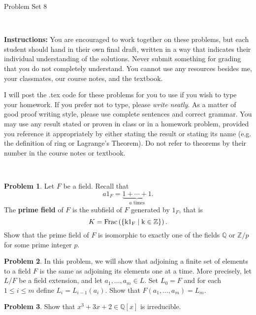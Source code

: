 \documentclass[11pt]{article}
\title{}
\date{\vspace{-0.5in}}
\newcommand{\Q}{\mathbb{Q}}
\newcommand{\Z}{\mathbb{Z}}
\theoremstyle{definition}
\newtheorem{problem}{Problem}
\begin{document}
\thispagestyle{fancy}
\pagestyle{fancy}

\vspace{3em}

\begin{center}
	{\LARGE Problem Set 8}
\end{center}

\

\noindent
{\bf Instructions:}
You are encouraged to work together on these problems, but each student should hand in their own final draft, written in a way that indicates their individual understanding of the solutions. Never submit something for grading that you do not completely understand. You cannot use any resources besides me, your classmates, our course notes, and the textbook.


I will post the .tex code for these problems for you to use if you wish to type your homework. If you prefer not to type, please  {\em write neatly}. As a matter of good proof writing style, please use complete sentences and correct grammar. You may use any result  stated or proven in class or in a homework problem, provided you reference it appropriately by either stating the result or stating its name (e.g. the definition of ring or Lagrange's Theorem). Do not refer to theorems by their number in the course notes or textbook.


\


\begin{problem}
Let $F$ be a field. Recall that
$$a 1_F = \underset{a \textrm{ times}}{\underbrace{1 + \cdots + 1}}.$$ The {\bf prime field} of $F$ is the subfield of $F$ generated by $1_F$, that is
$$K=\rm{Frac}\left(\{k1_F \mid k\in \Z\}\right).$$ 
Show that the prime field of $F$ is isomorphic to exactly one of the fields $\Q$ or $\Z/p$ for some prime integer $p$.
\end{problem}




\begin{problem}
In this problem, we will show that adjoining a finite set of elements to a field $F$ is the same as adjoining its elements one at a time.
More precisely, let $L/F$ be a field extension, and let $a_1, \ldots, a_m \in L$. Set $L_0 = F$ and for each $1 \leqslant i \leqslant m$ define $L_i = L_{i-1}(a_i)$. Show that $F(a_1,\ldots,a_m) = L_m$.
\end{problem}


\begin{problem}
	Show that $x^3+3x+2 \in \Q[x]$ is irreducible.
\end{problem}
\end{document}
